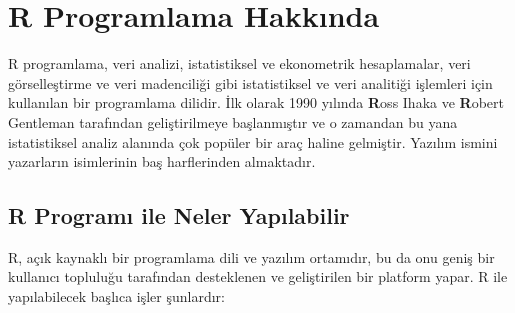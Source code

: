 \documentclass[
  letterpaper,
  DIV=11,
  numbers=noendperiod]{scrreprt}
\begin{document}

\hypertarget{sec-intro}{%
\chapter*{R Programlama Hakkında}\label{sec-intro}}


R programlama, veri analizi, istatistiksel ve ekonometrik hesaplamalar,
veri görselleştirme ve veri madenciliği gibi istatistiksel ve veri
analitiği işlemleri için kullanılan bir programlama dilidir. İlk olarak
1990 yılında \textbf{R}oss Ihaka ve \textbf{R}obert Gentleman tarafından
geliştirilmeye başlanmıştır ve o zamandan bu yana istatistiksel analiz
alanında çok popüler bir araç haline gelmiştir. Yazılım ismini
yazarların isimlerinin baş harflerinden almaktadır.

\hypertarget{r-programux131-ile-neler-yapux131labilir}{%
\section*{R Programı ile Neler
Yapılabilir}\label{r-programux131-ile-neler-yapux131labilir}}


R, açık kaynaklı bir programlama dili ve yazılım ortamıdır, bu da onu
geniş bir kullanıcı topluluğu tarafından desteklenen ve geliştirilen bir
platform yapar. R ile yapılabilecek başlıca işler şunlardır:
\end{document}
